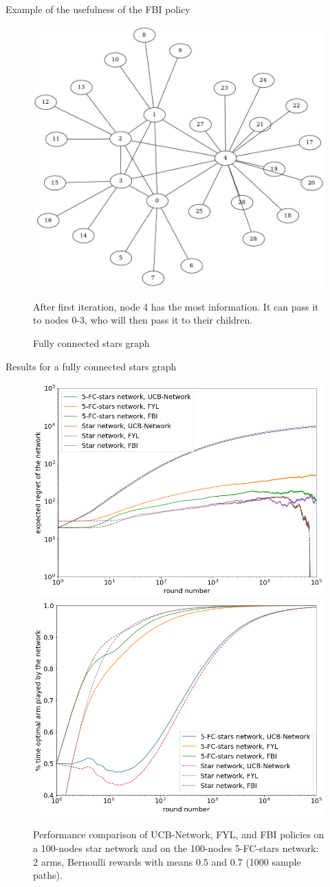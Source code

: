 \documentclass{beamer}
\begin{document}
\begin{frame}{Example of the usefulness of the FBI policy}
\begin{figure}
\includegraphics[scale=0.18]{fcstars}
\caption{\centering Fully connected stars graph}
After first iteration, node 4 has the most information. It can pass it to nodes 0-3, who will then pass it to their children. 
\end{figure}
\end{frame}

\begin{frame}{Results for a fully connected stars graph}
\begin{figure}[H]
  \centering
  \includegraphics[width=0.49\linewidth]{fig4_1.png}
  \includegraphics[width=0.49\linewidth]{fig4_2.png}
  \caption{\centering Performance comparison of UCB-Network, FYL, and FBI policies on a 100-nodes star network and on the 100-nodes 5-FC-stars network: 2 arms, Bernoulli rewards with means $0.5$ and $0.7$ (1000 sample paths).}
\end{figure}
\end{frame}
\end{document}
